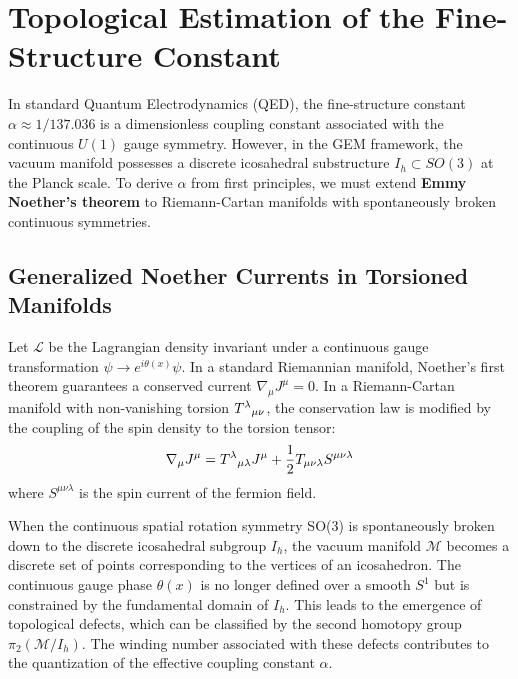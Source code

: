 \section{Topological Estimation of the Fine-Structure Constant}
\label{sec:alpha}

In standard Quantum Electrodynamics (QED), the fine-structure constant $\alpha \approx 1/137.036$ is a dimensionless coupling constant associated with the continuous $U(1)$ gauge symmetry. However, in the GEM framework, the vacuum manifold possesses a discrete icosahedral substructure $I_h \subset SO(3)$ at the Planck scale. To derive $\alpha$ from first principles, we must extend \textbf{Emmy Noether's theorem} to Riemann-Cartan manifolds with spontaneously broken continuous symmetries.

\subsection{Generalized Noether Currents in Torsioned Manifolds}

\begin{definition}
Let $\mathcal{L}$ be the Lagrangian density invariant under a continuous gauge transformation $\psi \to e^{i\theta(x)}\psi$. In a standard Riemannian manifold, Noether's first theorem guarantees a conserved current $\nabla_\mu J^\mu = 0$. 
In a Riemann-Cartan manifold with non-vanishing torsion $T^\lambda{}_{\mu\nu}$, the conservation law is modified by the coupling of the spin density to the torsion tensor:
\begin{equation}
    \nabla_\mu J^\mu = T^\lambda{}_{\mu\lambda} J^\mu + \frac{1}{2} T_{\mu\nu\lambda} S^{\mu\nu\lambda}
\end{equation}
where $S^{\mu\nu\lambda}$ is the spin current of the fermion field.
\end{definition}

\begin{remark}
When the continuous spatial rotation symmetry SO(3) is spontaneously broken down to the discrete icosahedral subgroup $I_h$, the vacuum manifold $\mathcal{M}$ becomes a discrete set of points corresponding to the vertices of an icosahedron. The continuous gauge phase $\theta(x)$ is no longer defined over a smooth $S^1$ but is constrained by the fundamental domain of $I_h$. This leads to the emergence of topological defects, which can be classified by the second homotopy group $\pi_2(\mathcal{M}/I_h)$. The winding number associated with these defects contributes to the quantization of the effective coupling constant $\alpha$.
\end{remark}

